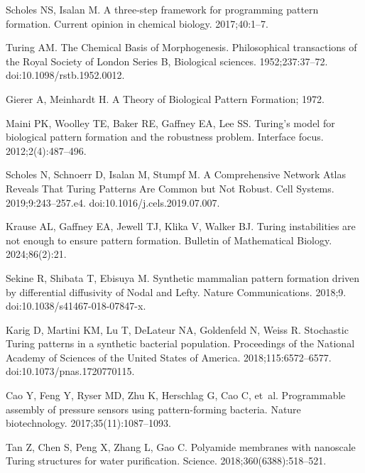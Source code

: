 \documentclass[10pt,letterpaper]{article}
\begin{document}
\begin{thebibliography}{10}
	
	Scholes NS, Isalan M.
	\newblock A three-step framework for programming pattern formation.
	\newblock Current opinion in chemical biology. 2017;40:1--7.
	
	Turing AM.
	\newblock The Chemical Basis of Morphogenesis.
	\newblock Philosophical transactions of the Royal Society of London Series B,
	Biological sciences. 1952;237:37--72.
	\newblock doi:{10.1098/rstb.1952.0012}.
	
	Gierer A, Meinhardt H. A Theory of Biological Pattern Formation; 1972.
	
	Maini PK, Woolley TE, Baker RE, Gaffney EA, Lee SS.
	\newblock Turing's model for biological pattern formation and the robustness
	problem.
	\newblock Interface focus. 2012;2(4):487--496.
	
	Scholes N, Schnoerr D, Isalan M, Stumpf M.
	\newblock A Comprehensive Network Atlas Reveals That Turing Patterns Are Common
	but Not Robust.
	\newblock Cell Systems. 2019;9:243--257.e4.
	\newblock doi:{10.1016/j.cels.2019.07.007}.
	
	Krause AL, Gaffney EA, Jewell TJ, Klika V, Walker BJ.
	\newblock Turing instabilities are not enough to ensure pattern formation.
	\newblock Bulletin of Mathematical Biology. 2024;86(2):21.
	
	Sekine R, Shibata T, Ebisuya M.
	\newblock Synthetic mammalian pattern formation driven by differential
	diffusivity of Nodal and Lefty.
	\newblock Nature Communications. 2018;9.
	\newblock doi:{10.1038/s41467-018-07847-x}.
	
	Karig D, Martini KM, Lu T, DeLateur NA, Goldenfeld N, Weiss R.
	\newblock Stochastic Turing patterns in a synthetic bacterial population.
	\newblock Proceedings of the National Academy of Sciences of the United States
	of America. 2018;115:6572--6577.
	\newblock doi:{10.1073/pnas.1720770115}.
	
	Cao Y, Feng Y, Ryser MD, Zhu K, Herschlag G, Cao C, et~al.
	\newblock Programmable assembly of pressure sensors using pattern-forming
	bacteria.
	\newblock Nature biotechnology. 2017;35(11):1087--1093.
	
	Tan Z, Chen S, Peng X, Zhang L, Gao C.
	\newblock Polyamide membranes with nanoscale Turing structures for water
	purification.
	\newblock Science. 2018;360(6388):518--521.
	

\end{thebibliography}
\end{document}
